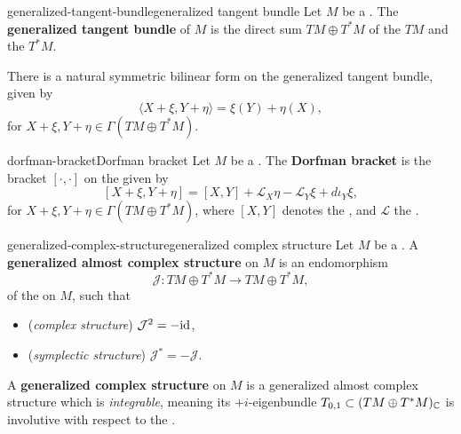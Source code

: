 \begin{topic}{generalized-tangent-bundle}{generalized tangent bundle}
    Let $M$ be a . The \textbf{generalized tangent bundle} of $M$ is the direct sum $TM \oplus T^*M$ of the  $TM$ and the  $T^*M$.
    
    There is a natural symmetric bilinear form on the generalized tangent bundle, given by
    \[ \langle X + \xi, Y + \eta \rangle = \xi(Y) + \eta(X) , \]
    for $X + \xi, Y + \eta \in \Gamma(TM \oplus T^*M)$.
\end{topic}

\begin{topic}{dorfman-bracket}{Dorfman bracket}
    Let $M$ be a . The \textbf{Dorfman bracket} is the bracket $[\cdot, \cdot]$ on the  given by
    \[ [X + \xi, Y + \eta] = [X, Y] + \mathcal{L}_X \eta - \mathcal{L}_Y \xi + d \iota_Y \xi , \]
    for $X + \xi, Y + \eta \in \Gamma(TM \oplus T^*M)$, where $[X, Y]$ denotes the , and $\mathcal{L}$ the .
\end{topic}

\begin{topic}{generalized-complex-structure}{generalized complex structure}
    Let $M$ be a . A \textbf{generalized almost complex structure} on $M$ is an endomorphism
    \[ \mathcal{J} \colon TM \oplus T^*M \to TM \oplus T^*M , \]
    of the  on $M$, such that
    \begin{itemize}
        \item (\textit{complex structure}) $\mathcal{J}^2 = -\textup{id}$,
        \item (\textit{symplectic structure}) $\mathcal{J}^* = -\mathcal{J}$.
    \end{itemize}
    A \textbf{generalized complex structure} on $M$ is a generalized almost complex structure which is \textit{integrable}, meaning its $+i$-eigenbundle $T_{0, 1} \subset (TM \oplus T^*M)_{\mathbb{C}}$ is involutive with respect to the .
\end{topic}

